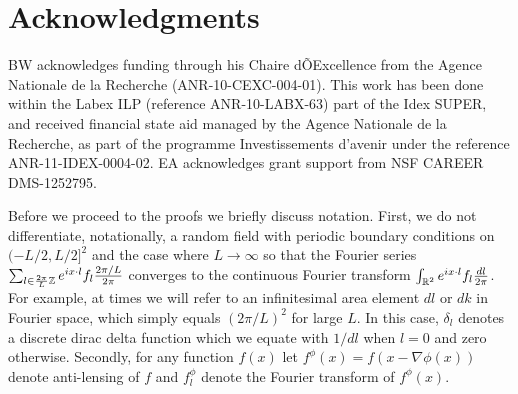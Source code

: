 \documentclass[iop,revtex4,apj,onecolumn]{emulateapj}
\begin{document}
%
%

\section*{Acknowledgments}
BW acknowledges funding through his Chaire dÕExcellence from the Agence Nationale
de la Recherche (ANR-10-CEXC-004-01). This work has been done within the Labex ILP (reference ANR-10-LABX-63) part of the Idex SUPER, and received financial state aid managed by the Agence Nationale de la Recherche, as part of the programme Investissements d'avenir under the reference ANR-11-IDEX-0004-02. EA acknowledges grant support from NSF CAREER DMS-1252795.




%
%
\appendix


Before we proceed to the proofs we briefly discuss notation.
First, we do not differentiate, notationally, a random field with periodic boundary conditions on $(-L/2, L/2]^2$ and the case where $L\rightarrow \infty$ so that the Fourier series $\sum_{l \in \frac{2\pi}{L}\Bbb Z }   e^{i x\cdot l}  f_l \frac{2\pi/ L}{2\pi} $ converges to the continuous Fourier transform $\int_{\Bbb R^2}  e^{i x\cdot l}  f_l \frac{dl}{2\pi} $. %
For example, at times we will refer to an infinitesimal area element $dl$ or $dk$ in Fourier space, which simply equals $(2\pi / L)^2$ for large $L$. In this case, $\delta_l$ denotes a discrete dirac delta function which we equate with $1/dl$ when $l=0$ and zero otherwise. 
Secondly, for any function $f(x)$ let $f^\phi(x) = f(x-\nabla \phi(x))$ denote anti-lensing of $f$ and $f^\phi_l$ denote the Fourier transform of  $f^\phi(x)$.
\end{document}
